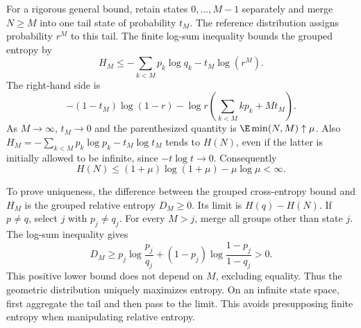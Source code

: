 For a rigorous general bound, retain states $0,\ldots,M-1$ separately and merge $N\ge M$ into one tail state of probability $t_M$. The reference distribution assigns probability $r^M$ to this tail. The finite log-sum inequality bounds the grouped entropy by
\[
H_M\le-\sum_{k<M}p_k\log q_k-t_M\log(r^M).
\]
The right-hand side is
\[
-(1-t_M)\log(1-r)
-\log r\left(\sum_{k<M}kp_k+Mt_M\right).
\]
As $M\to\infty$, $t_M\to0$ and the parenthesized quantity is $\E\min(N,M)\uparrow\mu$. Also
$H_M=-\sum_{k<M}p_k\log p_k-t_M\log t_M$ tends to $H(N)$, even if the latter is initially allowed to be infinite, since $-t\log t\to0$. Consequently
\[
H(N)\le(1+\mu)\log(1+\mu)-\mu\log\mu<\infty.
\]

To prove uniqueness, the difference between the grouped cross-entropy bound and $H_M$ is the grouped relative entropy $D_M\ge0$. Its limit is $H(q)-H(N)$. If $p\ne q$, select $j$ with $p_j\ne q_j$. For every $M>j$, merge all groups other than state $j$. The log-sum inequality gives
\[
D_M\ge
p_j\log\frac{p_j}{q_j}
+(1-p_j)\log\frac{1-p_j}{1-q_j}>0.
\]
This positive lower bound does not depend on $M$, excluding equality. Thus the geometric distribution uniquely maximizes entropy.
\insight On an infinite state space, first aggregate the tail and then pass to the limit. This avoids presupposing finite entropy when manipulating relative entropy.
